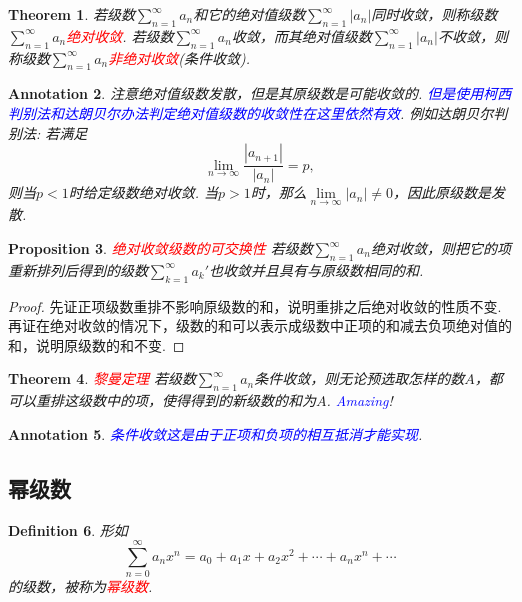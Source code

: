 \documentclass{article}
\newtheorem{theorem}{Theorem}[section]
\newtheorem{proposition}[theorem]{Proposition}
\newtheorem{definition}[theorem]{Definition}
\newtheorem{annotation}[theorem]{Annotation}
\newcommand{\redt}[1]{\textcolor{red}{#1}}
\newcommand{\bluet}[1]{\textcolor{blue}{#1}}
\begin{document}
\begin{theorem}
\rm 若级数$\sum\limits_{n=1}^{\infty}a_n$和它的绝对值级数$\sum\limits_{n=1}^{\infty}|a_n|$同时收敛，则称级数$\sum\limits_{n=1}^{\infty}a_n$\redt{绝对收敛}. 若级数$\sum\limits_{n=1}^{\infty}a_n$收敛，而其绝对值级数$\sum\limits_{n=1}^{\infty}|a_n|$不收敛，则称级数$\sum\limits_{n=1}^{\infty}a_n$\redt{非绝对收敛}(条件收敛).
\end{theorem}

\begin{annotation}
\rm 注意绝对值级数发散，但是其原级数是可能收敛的. \bluet{但是使用柯西判别法和达朗贝尔办法判定绝对值级数的收敛性在这里依然有效}. 例如达朗贝尔判别法: 若满足
$$
\lim\limits_{n \to \infty} \frac{|a_{n+1}|}{|a_{n}|} = p, 
$$
则当$p < 1$时给定级数绝对收敛. 当$p > 1$时，那么$\lim\limits_{n \to \infty}|a_n| \neq 0$，因此原级数是发散. 
\end{annotation}

\begin{proposition}
\rm \redt{绝对收敛级数的可交换性} 若级数$\sum\limits_{n=1}^{\infty}a_n$绝对收敛，则把它的项重新排列后得到的级数$\sum\limits_{k=1}^{\infty}a_k'$也收敛并且具有与原级数相同的和. 
\end{proposition}

\begin{proof}
先证正项级数重排不影响原级数的和，说明重排之后绝对收敛的性质不变. 再证在绝对收敛的情况下，级数的和可以表示成级数中正项的和减去负项绝对值的和，说明原级数的和不变.  
\end{proof}

\begin{theorem}
\rm \redt{黎曼定理} 若级数$\sum\limits_{n=1}^{\infty}a_n$条件收敛，则无论预选取怎样的数$A$，都可以重排这级数中的项，使得得到的新级数的和为$A$. \bluet{Amazing}!
\end{theorem}

\begin{annotation}
\rm \bluet{条件收敛这是由于正项和负项的相互抵消才能实现}. 
\end{annotation}

\subsection{幂级数}

\begin{definition}
\rm 形如
$$
\sum\limits_{n=0}^{\infty}a_nx^n =  a_0 + a_1x+ a_2x^2 + \cdots + a_nx^n + \cdots
$$
的级数，被称为\redt{幂级数}.
\end{definition}
\end{document}
